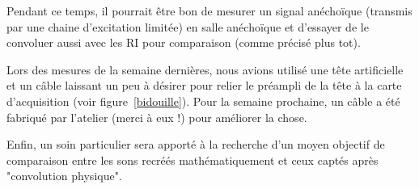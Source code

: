 \documentclass[12pt]{article}
\begin{document}
Pendant ce temps, il pourrait être bon de mesurer un signal anéchoïque (transmis par une chaine d'excitation limitée) en
salle anéchoïque et d'essayer de le convoluer aussi avec les RI pour comparaison (comme précisé plus tot).

Lors des mesures de la semaine dernières, nous avions utilisé une tête artificielle et un câble laissant un peu à
désirer pour relier le préampli de la tête à la carte d'acquisition (voir figure~\ref{bidouille}). Pour la semaine
prochaine, un câble a été fabriqué par l'atelier (merci à eux !) pour améliorer la chose.

Enfin, un soin particulier sera apporté à la recherche d'un moyen objectif de comparaison entre les sons recréés
mathématiquement et ceux captés après "convolution physique".


\end{document}
